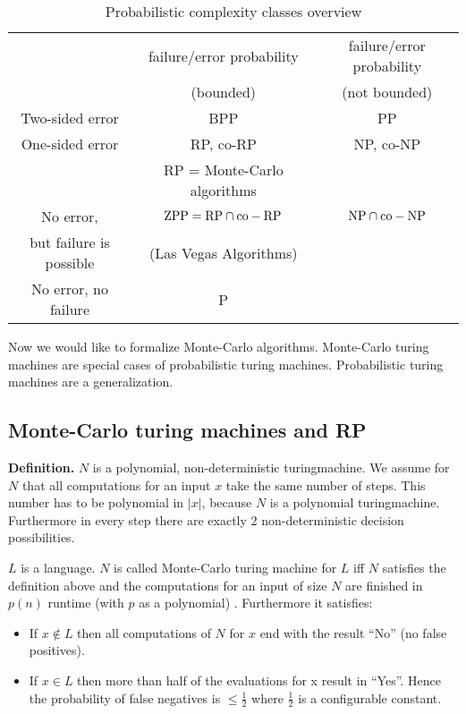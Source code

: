 \documentclass[a4paper]{article}
\newcommand{\cls}[1]{\rm{#1}}
\newcommand{\card}[1]{|#1|}
\begin{document}
\begin{table}
 \begin{center}
  \begin{tabular}{ccc}
   \hline \hline
      & failure/error probability & failure/error probability \\
      & (bounded) & (not bounded) \\
   \hline
     Two-sided error & \cls{BPP} & \cls{PP} \\
   \hline
     One-sided error & \cls{RP}, \cls{co-\cls{RP}} & \cls{NP}, \cls{co-NP} \\
                     & \cls{RP} = Monte-Carlo algorithms & \\
   \hline
     No error, & $\cls{ZPP} = \cls{RP} \cap \cls{co-\cls{RP}}$ & $\cls{NP} \cap \cls{co-NP}$ \\
     but failure is possible & (Las Vegas Algorithms) & \\
   \hline
     No error, no failure & \cls{P} & \\
   \hline \hline
  \end{tabular}
  \caption{Probabilistic complexity classes overview}
  \label{tab:prob_compl_classes}
 \end{center}
\end{table}

Now we would like to formalize Monte-Carlo algorithms.
Monte-Carlo turing machines are special cases of probabilistic turing machines.
Probabilistic turing machines are a generalization.

\subsection{Monte-Carlo turing machines and \cls{RP}}
%
\textbf{Definition.} $N$ is a polynomial, non-deterministic turingmachine.
We assume for $N$ that all computations for an input $x$ take the same number
of steps. This number has to be polynomial in $\card{x}$, because $N$ is
a polynomial turingmachine. Furthermore in every step there are exactly 2 non-deterministic decision possibilities.

$L$ is a language. $N$ is called Monte-Carlo turing machine for $L$ iff
$N$ satisfies the definition above and the computations for an input
of size $N$ are finished in $p(n)$ runtime (with $p$ as a polynomial) .
Furthermore it satisfies:
\begin{itemize}
  \item
    If $x \notin L$ then all computations of $N$ for $x$ end with the result ``No'' (no false positives).
  \item
    If $x \in L$ then more than half of the evaluations for x result in ``Yes''. Hence the probability of false negatives is $\leq \frac12$ where $\frac12$ is a configurable constant.
\end{itemize}
\end{document}
